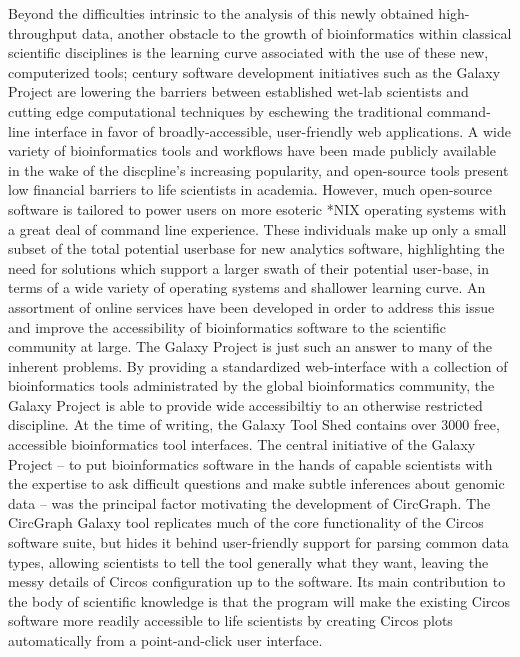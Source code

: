 \documentclass[twocolumn]{article}
\newcommand{\projectName}{CircGraph\xspace}
\begin{document}
Beyond the difficulties intrinsic to the analysis of this newly obtained high-throughput data, another obstacle to the growth of bioinformatics within classical scientific disciplines is the learning curve associated with the use of these new, computerized tools;  century software development initiatives such as the Galaxy Project are lowering the barriers between established wet-lab scientists and cutting edge computational techniques by eschewing the traditional command-line interface in favor of broadly-accessible, user-friendly web applications.\cite{galaxypaper} %
A wide variety of bioinformatics tools and workflows have been made publicly available in the wake of the discpline's increasing popularity, and open-source tools present low financial barriers to life scientists in academia. However, much open-source software is tailored to power users on more esoteric *NIX operating systems with a great deal of command line experience. These individuals make up only a small subset of the total potential userbase for new analytics software, highlighting the need for solutions which support a larger swath of their potential user-base, in terms of a wide variety of operating systems and shallower learning curve. An assortment of online services have been developed in order to address this issue and improve the accessibility of bioinformatics software to the scientific community at large. The Galaxy Project is just such an answer to many of the inherent problems. By providing a standardized web-interface with a collection of bioinformatics tools administrated by the global bioinformatics community, the Galaxy Project is able to provide wide accessibiltiy to an otherwise restricted discipline.\cite{galaxypaper} At the time of writing, the Galaxy Tool Shed contains over 3000 free, accessible bioinformatics tool interfaces.\cite{martin-ts} The central initiative of the Galaxy Project -- to put bioinformatics software in the hands of capable scientists with the expertise to ask difficult questions and make subtle inferences about genomic data -- was the principal factor motivating the development of \projectName.\cite{galaxypaper} The \projectName Galaxy tool replicates much of the core functionality of the Circos software suite, but hides it behind user-friendly support for parsing common data types, allowing scientists to tell the tool generally what they want, leaving the messy details of Circos configuration up to the software. Its main contribution to the body of scientific knowledge is that the program will make the existing Circos software more readily accessible to life scientists by creating Circos plots automatically from a point-and-click user interface.
\end{document}
